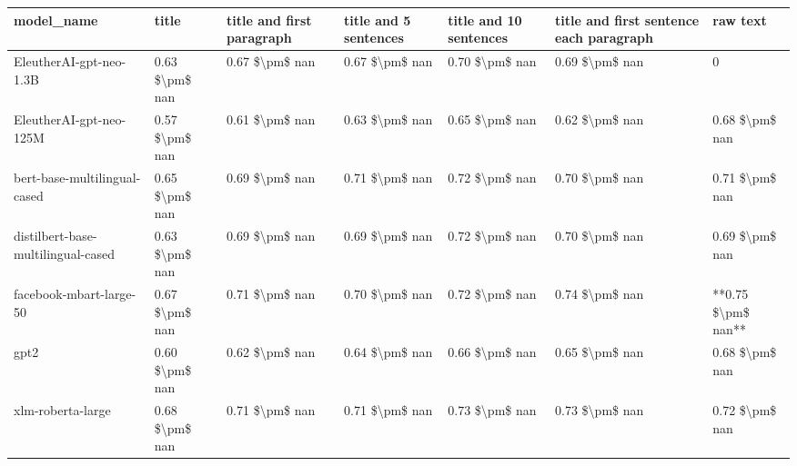 \begin{tabular}{lllllll}
\toprule
                        model\_name &          title & title and first paragraph & title and 5 sentences & title and 10 sentences & title and first sentence each paragraph &           raw text \\
\midrule
           EleutherAI-gpt-neo-1.3B & 0.63 \$\textbackslash pm\$ nan &            0.67 \$\textbackslash pm\$ nan &        0.67 \$\textbackslash pm\$ nan &         0.70 \$\textbackslash pm\$ nan &                          0.69 \$\textbackslash pm\$ nan &                  0 \\
           EleutherAI-gpt-neo-125M & 0.57 \$\textbackslash pm\$ nan &            0.61 \$\textbackslash pm\$ nan &        0.63 \$\textbackslash pm\$ nan &         0.65 \$\textbackslash pm\$ nan &                          0.62 \$\textbackslash pm\$ nan &     0.68 \$\textbackslash pm\$ nan \\
      bert-base-multilingual-cased & 0.65 \$\textbackslash pm\$ nan &            0.69 \$\textbackslash pm\$ nan &        0.71 \$\textbackslash pm\$ nan &         0.72 \$\textbackslash pm\$ nan &                          0.70 \$\textbackslash pm\$ nan &     0.71 \$\textbackslash pm\$ nan \\
distilbert-base-multilingual-cased & 0.63 \$\textbackslash pm\$ nan &            0.69 \$\textbackslash pm\$ nan &        0.69 \$\textbackslash pm\$ nan &         0.72 \$\textbackslash pm\$ nan &                          0.70 \$\textbackslash pm\$ nan &     0.69 \$\textbackslash pm\$ nan \\
           facebook-mbart-large-50 & 0.67 \$\textbackslash pm\$ nan &            0.71 \$\textbackslash pm\$ nan &        0.70 \$\textbackslash pm\$ nan &         0.72 \$\textbackslash pm\$ nan &                          0.74 \$\textbackslash pm\$ nan & **0.75 \$\textbackslash pm\$ nan** \\
                              gpt2 & 0.60 \$\textbackslash pm\$ nan &            0.62 \$\textbackslash pm\$ nan &        0.64 \$\textbackslash pm\$ nan &         0.66 \$\textbackslash pm\$ nan &                          0.65 \$\textbackslash pm\$ nan &     0.68 \$\textbackslash pm\$ nan \\
                 xlm-roberta-large & 0.68 \$\textbackslash pm\$ nan &            0.71 \$\textbackslash pm\$ nan &        0.71 \$\textbackslash pm\$ nan &         0.73 \$\textbackslash pm\$ nan &                          0.73 \$\textbackslash pm\$ nan &     0.72 \$\textbackslash pm\$ nan \\
\bottomrule
\end{tabular}
